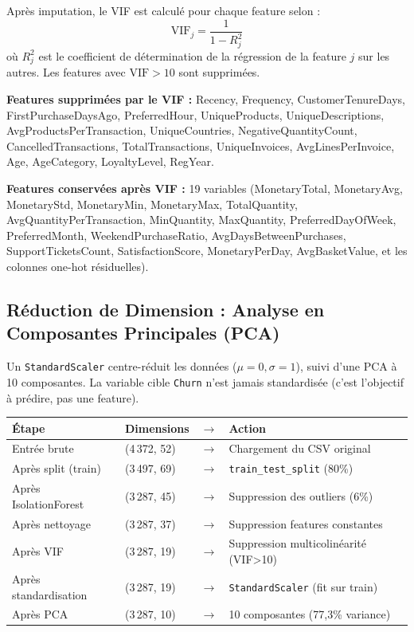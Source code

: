\documentclass[11pt,a4paper]{article}
\begin{document}
Après imputation, le VIF est calculé pour chaque feature selon :
$$\text{VIF}_j = \frac{1}{1 - R^2_j}$$
où $R^2_j$ est le coefficient de détermination de la régression de la feature $j$ sur les autres. Les features avec $\text{VIF} > 10$ sont supprimées.

\textbf{Features supprimées par le VIF :} Recency, Frequency, CustomerTenureDays, FirstPurchaseDaysAgo, PreferredHour, UniqueProducts, UniqueDescriptions, AvgProductsPerTransaction, UniqueCountries, NegativeQuantityCount, CancelledTransactions, TotalTransactions, UniqueInvoices, AvgLinesPerInvoice, Age, AgeCategory, LoyaltyLevel, RegYear.

\textbf{Features conservées après VIF :} 19 variables (MonetaryTotal, MonetaryAvg, MonetaryStd, MonetaryMin, MonetaryMax, TotalQuantity, AvgQuantityPerTransaction, MinQuantity, MaxQuantity, PreferredDayOfWeek, PreferredMonth, WeekendPurchaseRatio, AvgDaysBetweenPurchases, SupportTicketsCount, SatisfactionScore, MonetaryPerDay, AvgBasketValue, et les colonnes one-hot résiduelles).

\subsection{Réduction de Dimension : Analyse en Composantes Principales (PCA)}


Un \texttt{StandardScaler} centre-réduit les données ($\mu=0, \sigma=1$), suivi d'une PCA à 10 composantes. La variable cible \texttt{Churn} n'est jamais standardisée (c'est l'objectif à prédire, pas une feature).

\begin{tcolorbox}[colframe=headerblue, title=Évolution des dimensions du dataset]
\begin{center}
\renewcommand{\arraystretch}{1.4}
\begin{tabular}{llcl}
\toprule
\textbf{Étape} & \textbf{Dimensions} & $\rightarrow$ & \textbf{Action} \\
\midrule
Entrée brute & (4\,372, 52) & $\rightarrow$ & Chargement du CSV original \\
Après split (train) & (3\,497, 69) & $\rightarrow$ & \texttt{train\_test\_split} (80\%) \\
Après IsolationForest & (3\,287, 45) & $\rightarrow$ & Suppression des outliers (6\%) \\
Après nettoyage & (3\,287, 37) & $\rightarrow$ & Suppression features constantes \\
Après VIF & (3\,287, 19) & $\rightarrow$ & Suppression multicolinéarité (VIF>10) \\
Après standardisation & (3\,287, 19) & $\rightarrow$ & \texttt{StandardScaler} (fit sur train) \\
Après PCA & (3\,287, 10) & $\rightarrow$ & 10 composantes (77,3\% variance) \\
\bottomrule
\end{tabular}
\end{center}
\end{tcolorbox}
\end{document}
